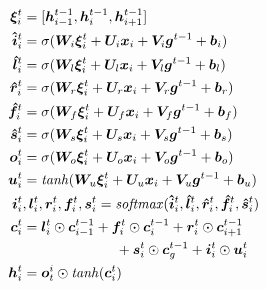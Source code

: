 \documentclass[11pt,a4paper]{article}
\begin{document}
\begin{equation} \label{eq:mlstm}
\begin{split}
\boldsymbol{\xi}_i^t &= [\boldsymbol{h}_{i-1}^{t-1}, \boldsymbol{h}_i^{t-1}, \boldsymbol{h}_{i+1}^{t-1}] \\
\boldsymbol{\hat{i}}_i^t &= \sigma(\boldsymbol{W}_i \boldsymbol{\xi}_i^t + \boldsymbol{U}_i \boldsymbol{x}_{i} + \boldsymbol{V}_i \boldsymbol{g}^{t-1} + \boldsymbol{b}_i)\\
\boldsymbol{\hat{l}}_i^t &= \sigma(\boldsymbol{W}_l \boldsymbol{\xi}_i^t + \boldsymbol{U}_l \boldsymbol{x}_{i} + \boldsymbol{V}_l \boldsymbol{g}^{t-1} + \boldsymbol{b}_l)\\
\boldsymbol{\hat{r}}_i^t &= \sigma(\boldsymbol{W}_r \boldsymbol{\xi}_i^t + \boldsymbol{U}_r \boldsymbol{x}_{i} + \boldsymbol{V}_r \boldsymbol{g}^{t-1} + \boldsymbol{b}_r)\\
\boldsymbol{\hat{f}}_i^t &= \sigma(\boldsymbol{W}_f \boldsymbol{\xi}_i^t + \boldsymbol{U}_f \boldsymbol{x}_{i} + \boldsymbol{V}_f \boldsymbol{g}^{t-1} + \boldsymbol{b}_f)\\
\boldsymbol{\hat{s}}_i^t &= \sigma(\boldsymbol{W}_s \boldsymbol{\xi}_i^t + \boldsymbol{U}_s \boldsymbol{x}_{i} + \boldsymbol{V}_s \boldsymbol{g}^{t-1} + \boldsymbol{b}_s)\\
\boldsymbol{o}_i^t &= \sigma(\boldsymbol{W}_o \boldsymbol{\xi}_i^t + \boldsymbol{U}_o \boldsymbol{x}_{i} + \boldsymbol{V}_o \boldsymbol{g}^{t-1} + \boldsymbol{b}_o)\\
\boldsymbol{u}_i^t &= {\it tanh}(\boldsymbol{W}_u \boldsymbol{\xi}_i^t + \boldsymbol{U}_u \boldsymbol{x}_{i} + \boldsymbol{V}_u \boldsymbol{g}^{t-1} + \boldsymbol{b}_u)\\
\boldsymbol{i}_i^t &, \boldsymbol{l}_i^t, \boldsymbol{r}_i^t, \boldsymbol{f}_i^t, \boldsymbol{s}_i^t = {\it softmax}(\boldsymbol{\hat{i}}_i^t, \boldsymbol{\hat{l}}_i^t, \boldsymbol{\hat{r}}_i^t, \boldsymbol{\hat{f}}_i^t, \boldsymbol{\hat{s}}_i^t)\\
\boldsymbol{c}_i^t &= \boldsymbol{l}_i^t \odot \boldsymbol{c}_{i-1}^{t-1} + \boldsymbol{f}_i^t \odot \boldsymbol{c}_{i}^{t-1} + \boldsymbol{r}_i^t \odot \boldsymbol{c}_{i+1}^{t-1}\\
~~~~~~&~~~~~~~~~~~~~~~~~~~~ + \boldsymbol{s}_i^t \odot \boldsymbol{c}_g^{t-1} + \boldsymbol{i}_i^t \odot \boldsymbol{u}_i^t\\
\boldsymbol{h}_i^t &= \boldsymbol{o}_t^i \odot {\it tanh}(\boldsymbol{c}_i^t)
\end{split}
\end{equation}
\end{document}
